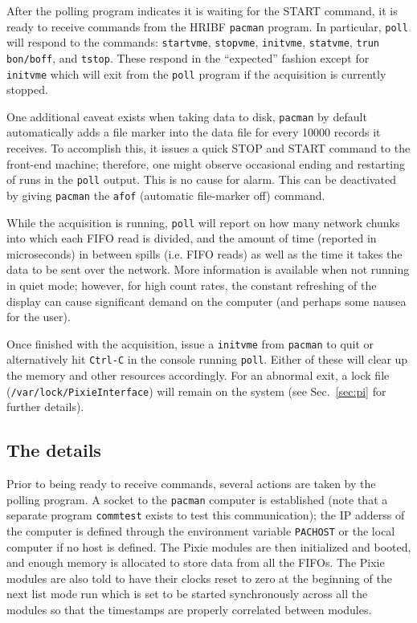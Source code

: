 \documentclass[10pt]{article}
\begin{document}
After the polling program indicates it is waiting for the \textsc{START} 
command, it is ready to receive commands from the HRIBF \texttt{pacman} 
program. In particular, \texttt{poll} will respond to the commands: 
\texttt{startvme}, \texttt{stopvme}, \texttt{initvme}, \texttt{statvme}, 
\texttt{trun bon/boff}, and \texttt{tstop}. These respond in the ``expected'' 
fashion except for \texttt{initvme} which will exit from the \texttt{poll} 
program if the acquisition is currently stopped.

One additional caveat exists when taking data to disk, \texttt{pacman} by
default automatically adds a file marker into the data file for every 10000
records it receives. To accomplish this, it issues a quick \textsc{STOP} and
\textsc{START} command to the front-end machine; therefore, one might observe
occasional ending and restarting of runs in the \texttt{poll} output. This is
no cause for alarm. This can be deactivated by giving \texttt{pacman} the
\texttt{afof} (automatic file-marker off) command.

While the acquisition is running, \texttt{poll} will report on how many network 
chunks into which each FIFO read is divided, and the amount of time (reported 
in microseconds) in between spills (i.e. FIFO reads) as well as the time it 
takes the data to be sent over the network. More information is available when 
not running in quiet mode; however, for high count rates, the constant 
refreshing of the display can cause significant demand on the computer (and 
perhaps some nausea for the user). 

Once finished with the acquisition, issue a \texttt{initvme} from 
\texttt{pacman} to quit or alternatively hit \texttt{Ctrl-C} in the console 
running \texttt{poll}. Either of these will clear up the memory and other 
resources accordingly. For an abnormal exit, a lock file 
(\texttt{/var/lock/PixieInterface}) will remain on the system (see 
Sec.~\ref{sec:pi} for further details).

\subsection{The details}
Prior to being ready to receive commands, several actions are taken by the
polling program. A socket to the \texttt{pacman} computer is established (note
that a separate program \texttt{commtest} exists to test this communication);
the IP adderss of the computer is defined through the environment variable
\texttt{PACHOST} or the local computer if no host is defined. The Pixie modules 
are then initialized and booted, and enough memory is allocated to store data 
from all the FIFOs. The Pixie modules are also told to have their clocks reset 
to zero at the beginning of the next list mode run which is set to be started 
synchronously across all the modules so that the timestamps are properly 
correlated between modules.
\end{document}
